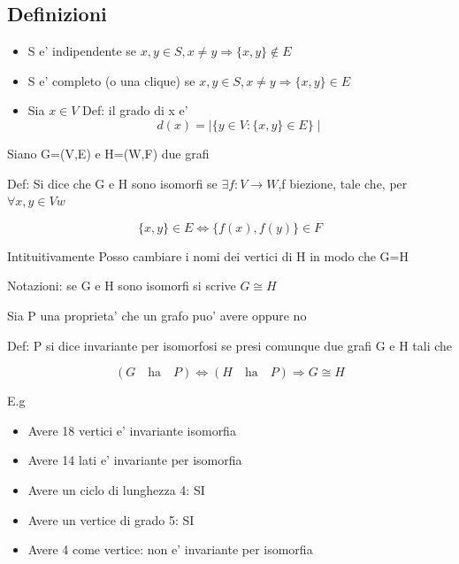 \documentclass{article}
\begin{document}
        \subsection*{Definizioni}
        \begin{itemize}
          \item S e' indipendente se $x,y\in S,x\neq y \Rightarrow \{x,y\} \notin E$
          \item S e' completo (o una clique) se $x,y \in S,x\neq y \Rightarrow \{x,y\} \in E$
          \item Sia $x \in V$ Def: il grado di x e'
            \begin{equation*}
              d(x)=\mid \{ y\in V:\{x,y\}\in E\} \mid
            \end{equation*}
        \end{itemize}
        \begin{flushleft}
          Siano G=(V,E) e H=(W,F) due grafi
        \end{flushleft}
        \begin{flushleft}
          Def: Si dice che G e H sono isomorfi se $\exists f: V\to W$,f biezione, tale che, per $\forall x,y \in Vw$
        \end{flushleft}
        \begin{equation*}
          \{ x,y \} \in E \iff \{ f(x),f(y) \} \in F
        \end{equation*}
        \begin{flushleft}
          Intituitivamente Posso cambiare i nomi dei vertici di H in modo che G=H
        \end{flushleft}
        \begin{flushleft}
          Notazioni: se G e H sono isomorfi si scrive $G \cong H$
        \end{flushleft}
        \begin{flushleft}
          Sia P una proprieta' che un grafo puo' avere oppure no
        \end{flushleft}
        \begin{flushleft}
          Def: P si dice invariante per isomorfosi se presi comunque due grafi G e H tali che
        \end{flushleft}
        \begin{equation*}
          (G \quad \text{ha} \quad P) \iff (H \quad \text{ha} \quad P) \Rightarrow G \cong H
        \end{equation*}
        \begin{flushleft}
          E.g
        \end{flushleft}
        \begin{itemize}
          \item Avere 18 vertici e' invariante isomorfia
          \item Avere 14 lati e' invariante per isomorfia
          \item Avere un ciclo di lunghezza 4: SI
          \item Avere un vertice di grado 5: SI
          \item Avere 4 come vertice: non e' invariante per isomorfia
        \end{itemize}
\end{document}
